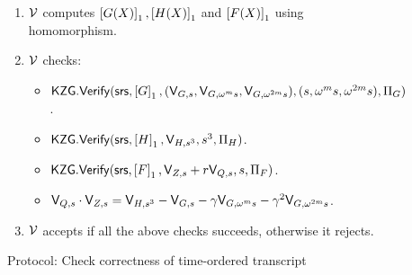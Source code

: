 \begin{figure}[htbp]
\begin{mdframed}
{\begin{enumerate}[leftmargin=1em, label=\arabic*.]
\begin{itemize}[leftmargin=1em]
            \end{itemize}
            \item $\verifier$ computes $\gone{G(X)},\gone{H(X)}$ and $\gone{F(X)}$ using homomorphism.
            \item $\verifier$ checks:
            \begin{itemize}[leftmargin=1em]
                \item $\kzgverify(\srs,\gone{G}, (\val{s}{G}, \val{\omega^m s}{G}, \val{\omega^{2m} s}{G}),\\(s,\omega^m s, \omega^{2m}s),\Pi_G)$.
                \item $\kzgverify(\srs,\gone{H}, \val{s^3}{H}, s^3, \Pi_H)$.
                \item $\kzgverify(\srs,\gone{F}, \val{s}{Z} + r\val{s}{Q}, s, \Pi_F)$.
                \item $\val{s}{Q}\cdot \val{s}{Z} = \val{s^3}{H}-\val{s}{G}-\gamma \val{\omega^m s}{G}-\gamma^2\val{\omega^{2m}s}{G}$.
            \end{itemize}
            \item $\verifier$ accepts if all the above checks succeeds, otherwise it rejects.
        \end{enumerate}
    }
    \end{mdframed}
    \vspace*{-5mm}
    \caption{Protocol: Check correctness of time-ordered transcript}
    \label{fig:time-ordered-transcript}
\end{figure}

